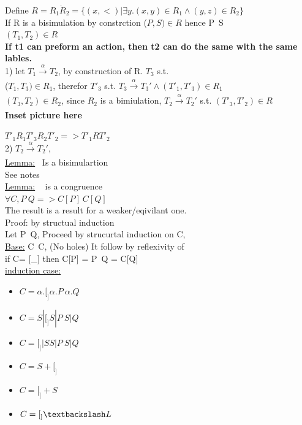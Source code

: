 \documentclass[a4paper,10pt,titlepage]{report}
\begin{document}
\hspace{5mm}	Define $R = R_1 \dot R_2 = \{(x,<) | \exists y. (x,y) \in R_1 \wedge (y,z) \in R_2 \}$ \\
\hspace{5mm}	If R is a bisimulation by constrction ($P,S) \in R$ hence P~S \\
	


$(T_1, T_2) \in R$ \\
\textbf{If t1 can preform an action, then t2 can do the same with the same lables.}\\
1) let $T_1 \xrightarrow[\text{}]{{ {\alpha} }} T_2$, by construction of R. $T_3$ s.t. \\
($T_1, T_3) \in R_1$, therefor $T'_3$ s.t. $T_3 \xrightarrow[\text{}]{{ {\alpha} }} T_3' \wedge (T'_1, T'_3) \in R_1$ \\
$(T_3, T_2) \in R_2$, since $R_2$ is a bimiulation, $T_2 \xrightarrow[\text{}]{{ {\alpha} }} T_2'$ s.t. $(T'_3, T'_2) \in R$\\
\textbf{Inset picture here}

$T'_1 R_1 T'_3 R_2 T'_2 => T'_1 R T'_2$ \\

2) $T_2 \xrightarrow[\text{}]{{ \alpha }} T_2', $\\

\underline{Lemma:} ~Is a bisimulartion \\
\hspace{5mm}	See notes \\
	
\vspace{5mm}
\underline{Lemma:} ~ is a congruence \\
\hspace{5mm}	$\forall C, P~Q => C[P] ~C[Q]$ \\
\hspace{5mm}	The result is a result for a weaker/eqivilant one.\\
\hspace{5mm}	Proof: by structual induction\\
\hspace{10mm}		Let P~Q, Proceed by strucurtal induction on C, \\
\hspace{5mm}		\underline{Base:} C~C, (No holes) It follow by reflexivity of ~\\
\hspace{10mm}			if C= [\_] then C[P] = P~Q = C[Q]\\
\hspace{5mm}		\underline{induction case:}\\
\hspace{5mm}			\begin{itemize}
			\item $C = \alpha.[_] \alpha.P ~ \alpha.Q$
			\item $C = S|[_] S|P ~S|Q$
			\item $C = [_]|S S|P ~S|Q$
			\item $C = S+[_]$
			\item $C = [_]+S$
			\item $C = [_]\textbackslash L$
			\end{itemize}
\end{document}

